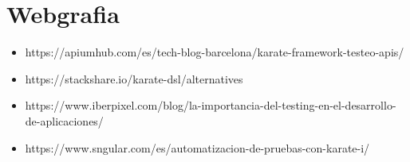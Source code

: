 \documentclass{article}
\begin{document}
\section{Webgrafia}
\begin{itemize}
\item https://apiumhub.com/es/tech-blog-barcelona/karate-framework-testeo-apis/ 

\item https://stackshare.io/karate-dsl/alternatives

\item https://www.iberpixel.com/blog/la-importancia-del-testing-en-el-desarrollo-de-aplicaciones/

\item https://www.sngular.com/es/automatizacion-de-pruebas-con-karate-i/
\end{itemize} 
\end{document}
